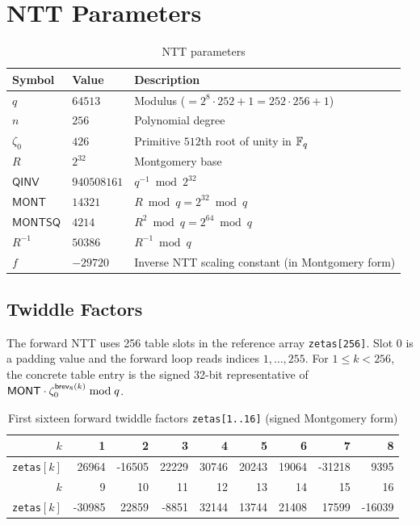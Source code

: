 \section{\haetae{} NTT Parameters}
\label{sec:haetae_params}

\begin{table}[htbp]
\centering
\caption{\haetae{} NTT parameters}
\label{tab:params}
\begin{tabular}{lll}
\toprule
Symbol & Value & Description \\
\midrule
$q$    & $64513$ & Modulus ($= 2^8 \cdot 252 + 1 = 252 \cdot 256 + 1$) \\
$n$    & $256$   & Polynomial degree \\
$\zeta_0$ & $426$ & Primitive $512$th root of unity in $\mathbb{F}_q$ \\
$R$    & $2^{32}$ & Montgomery base \\
$\mathsf{QINV}$ & $940508161$ & $q^{-1} \bmod 2^{32}$ \\
$\mathsf{MONT}$ & $14321$ & $R \bmod q = 2^{32} \bmod q$ \\
$\mathsf{MONTSQ}$ & $4214$ & $R^2 \bmod q = 2^{64} \bmod q$ \\
$R^{-1}$ & $50386$ & $R^{-1} \bmod q$ \\
$f$ & $-29720$ & Inverse NTT scaling constant (in Montgomery form) \\
\bottomrule
\end{tabular}
\end{table}

\subsection{Twiddle Factors}

The forward NTT uses 256 table slots in the reference array
\texttt{zetas[256]}.  Slot 0 is a padding value and the forward loop reads
indices $1,\dots,255$.  For $1 \le k < 256$, the concrete table entry is the
signed 32-bit representative of
$\mathsf{MONT} \cdot \zeta_0^{\mathsf{brev}_8(k)} \bmod q$.

\begin{table}[htbp]
\centering
\caption{First sixteen forward twiddle factors \texttt{zetas[1..16]} (signed Montgomery form)}
\label{tab:zetas}
\begin{tabular}{r|rrrrrrrr}
\toprule
$k$ & 1 & 2 & 3 & 4 & 5 & 6 & 7 & 8 \\
\midrule
\texttt{zetas}$[k]$ & 26964 & -16505 & 22229 & 30746 & 20243 & 19064 & -31218 & 9395 \\
\midrule
$k$ & 9 & 10 & 11 & 12 & 13 & 14 & 15 & 16 \\
\midrule
\texttt{zetas}$[k]$ & -30985 & 22859 & -8851 & 32144 & 13744 & 21408 & 17599 & -16039 \\
\bottomrule
\end{tabular}
\end{table}


